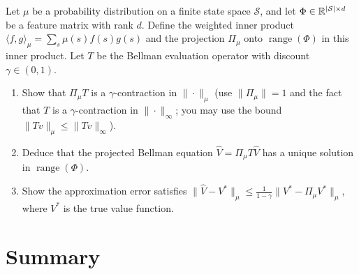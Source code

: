 \documentclass[11pt,a4paper]{article}
\begin{document}
\begin{exercise}
\label{ex:proj-error-rl}
Let $\mu$ be a probability distribution on a finite state space
$\mathcal{S}$, and let $\Phi \in \mathbb{R}^{|\mathcal{S}| \times d}$ be a
feature matrix with rank $d$. Define the weighted inner product
$\langle f, g \rangle_\mu = \sum_{s} \mu(s) f(s) g(s)$ and the
projection $\Pi_\mu$ onto $\operatorname{range}(\Phi)$ in this inner product. Let $T$
be the Bellman evaluation operator with discount $\gamma \in (0,1)$.
\begin{enumerate}[label=(\alph*)]
    \item Show that $\Pi_\mu T$ is a $\gamma$-contraction in
          $\|\cdot\|_\mu$ (use $\|\Pi_\mu\| = 1$ and the fact that $T$
          is a $\gamma$-contraction in $\|\cdot\|_\infty$; you may use
          the bound $\|T v\|_\mu \leq \|T v\|_\infty$).
    \item Deduce that the projected Bellman equation
          $\hat{V} = \Pi_\mu T \hat{V}$ has a unique solution in
          $\operatorname{range}(\Phi)$.
    \item Show the approximation error satisfies
          $\|\hat{V} - V^*\|_\mu
          \leq \frac{1}{1 - \gamma} \|V^* - \Pi_\mu V^*\|_\mu$,
          where $V^*$ is the true value function.
\end{enumerate}
\end{exercise}


\section{Summary}
\label{sec:summary}
\end{document}
